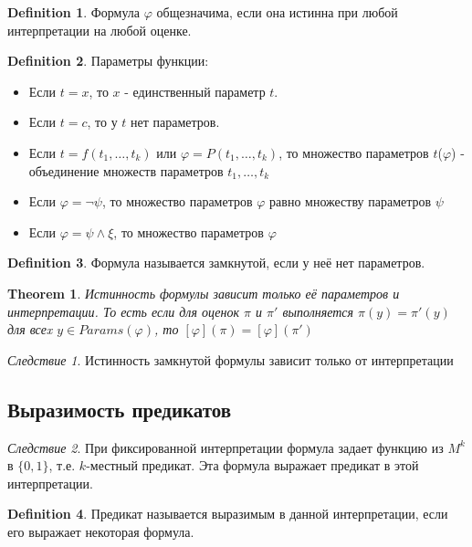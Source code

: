 \documentclass[a4paper]{article}
\theoremstyle{plain}
\newtheorem{theorem}{Theorem}
\theoremstyle{remark}
\newtheorem{corollary}{Следствие}
\theoremstyle{definition}
\newtheorem{definition}{Definition}
\begin{document}
\begin{definition}
	Формула $\varphi$ общезначима, если она истинна при любой интерпретации на любой оценке. 
\end{definition}

\begin{definition}
	Параметры функции:
	\begin{itemize}
		\item Если $t = x$, то $x$ - единственный параметр $t$.
		\item Если $t = c$, то у $t$ нет параметров. 
		\item Если $t = f(t_1, \ldots, t_k)$ или $\varphi = P(t_1, \ldots, t_k)$, то множество параметров $t$($\varphi$) - объединение множеств параметров $t_1, \ldots, t_k$
		\item Если $\varphi = \lnot \psi$, то множество параметров $\varphi$ равно множеству параметров $\psi$
		\item Если $\varphi = \psi \land \xi$, то множество параметров $\varphi$
	\end{itemize}
\end{definition}

\begin{definition}
	Формула называется замкнутой, если у неё нет параметров.
\end{definition}


\begin{theorem}
	Истинность формулы зависит только её параметров и интерпретации. То есть если для оценок $\pi$ и $\pi'$ выполняется $\pi(y) = \pi'(y)$ для всеx $y \in Params( \varphi)$, то $[\varphi](\pi) = [\varphi](\pi')$
\end{theorem}

\begin{corollary}
	Истинность замкнутой формулы зависит только от интерпретации
\end{corollary}
\subsection{Выразимость предикатов}
\begin{corollary}
	При фиксированной интерпретации формула задает функцию из $M^k$ в $\{0,1\}$, т.е. $k$-местный предикат. Эта формула выражает предикат в этой интерпретации. 
\end{corollary}

\begin{definition}
	Предикат называется выразимым в данной интерпретации, если его выражает некоторая формула.
\end{definition}
\end{document}
